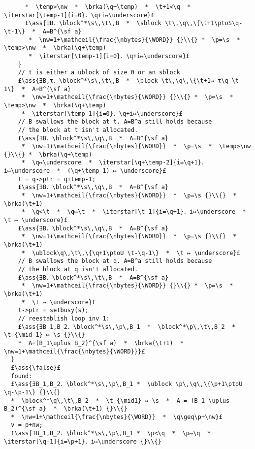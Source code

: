 \documentclass[12pt,a4paper]{article}
\makeatletter
\newcommand{\ml}[2][t]{\mbox{\mdseries\begin{tabular}[#1]{@{}L@{}}#2\end{tabular}}}
\newcommand{\ass}[1]{\ensuremath{{\color{blue}\left\{\ml[c]{#1}\right\}}}}
\newcommand{\iterstar}[2][]{\text{\LARGE $*$}^{#1}_{#2}}
\newcommand{\block}{\mathop{\emph{block}}}
\newcommand{\ublock}{\mathop{\emph{ublock}}}
\newcommand{\sblock}{\mathop{\emph{sblock}}}
\newcommand{\s}{{\tt s}}
\renewcommand{\t}{{\tt t}}
\newcommand{\temp}{{\tt temp}}
\newcommand{\p}{{\tt p}}
\newcommand{\q}{{\tt q}}
\newcommand{\brka}{\mathop{\emph{brka}}}
\newcommand{\nw}{{\tt nw}}
\newcommand{\nbytes}{{\tt nbytes}}
\newcommand{\WORD}{{\tt WORD}}
\newcommand{\mathceil}[1]{\left\lceil#1\right\rceil}
\newcommand{\ptoU}{\mathbin{↦_{\sf u}}}
\newcommand{\ptoS}{\mathbin{↦_{\sf s}}}
\makeatother
\begin{document}
\begin{lstlisting}
      *  \temp>\nw  *  \brka(\q+\temp)  *  \t+1<\q  *  \iterstar[\temp-1]{i=0}．\q+i↦\underscore}£
      £\ass{∃B．\block^*\s\,\t\,B  *  \sblock \t\,\q\,\{\t+1\ptoS\q-\t-1\}  *  A=B^{\sf a} 
       *  \nw=1+\mathceil{\frac{\nbytes}{\WORD}} {}\\{} *  \p=\s  *  \temp>\nw  *  \brka(\q+\temp) 
       *  \iterstar[\temp-1]{i=0}．\q+i↦\underscore}£
    }
    // t is either a ublock of size 0 or an sblock
    £\ass{∃B,τ．\block^*\s\,\t\,B  *  \block \t\,\q\,\{\t+1↦_τ\q-\t-1\}  *  A=B^{\sf a} 
     *  \nw=1+\mathceil{\frac{\nbytes}{\WORD}} {}\\{} *  \p=\s  *  \temp>\nw  *  \brka(\q+\temp) 
     *  \iterstar[\temp-1]{i=0}．\q+i↦\underscore}£
    // B swallows the block at t. A=B^a still holds because 
    // the block at t isn't allocated.
    £\ass{∃B．\block^*\s\,\q\,B  *  A=B^{\sf a}
     *  \nw=1+\mathceil{\frac{\nbytes}{\WORD}}  *  \p=\s  *  \temp>\nw {}\\{} *  \brka(\q+\temp) 
     *  \q↦\underscore  *  \iterstar[\q+\temp-2]{i=\q+1}．i↦\underscore  *  (\q+\temp-1) ↦ \underscore}£
    t = q->ptr = q+temp-1;
    £\ass{∃B．\block^*\s\,\q\,B  *  A=B^{\sf a} 
     *  \nw=1+\mathceil{\frac{\nbytes}{\WORD}}  *  \p=\s {}\\{}  *  \brka(\t+1) 
     *  \q<\t  *  \q↦\t  *  \iterstar[\t-1]{i=\q+1}．i↦\underscore  *  \t ↦ \underscore}£
    £\ass{∃B．\block^*\s\,\q\,B  *  A=B^{\sf a} 
     *  \nw=1+\mathceil{\frac{\nbytes}{\WORD}}  *  \p=\s {}\\{}  *  \brka(\t+1) 
     *  \ublock\q\,\t\,\{\q+1\ptoU \t-\q-1\}  *  \t ↦ \underscore}£
    // B swallows the block at q. A=B^a still holds because 
    // the block at q isn't allocated.
    £\ass{∃B．\block^*\s\,\t\,B  *  A=B^{\sf a} 
     *  \nw=1+\mathceil{\frac{\nbytes}{\WORD}} {}\\{} *  \p=\s  *  \brka(\t+1) 
     *  \t ↦ \underscore}£
    t->ptr = setbusy(s);
    // reestablish loop inv 1:
    £\ass{∃B_1,B_2．\block^*\s\,\p\,B_1  *  \block^*\p\,\t\,B_2  *  \t_{\mid 1} ↦ \s {}\\{}
    *  A=(B_1\uplus B_2)^{\sf a}  *  \brka(\t+1)  *  \nw=1+\mathceil{\frac{\nbytes}{\WORD}}}£
  }
  £\ass{\false}£
  found:
  £\ass{∃B_1,B_2．\block^*\s\,\p\,B_1 *  \ublock \p\,\q\,\{\p+1\ptoU \q-\p-1\} {}\\{}
  *  \block^*\q\,\t\,B_2  *  \t_{\mid1} ↦ \s  *  A = (B_1 \uplus B_2)^{\sf a}  *  \brka(\t+1) {}\\{}
  *  \nw=1+\mathceil{\frac{\nbytes}{\WORD}}  *  \q\geq\p+\nw}£ 
  v = p+nw;
  £\ass{∃B_1,B_2．\block^*\s\,\p\,B_1 *  \p<\q  *  \p↦\q  *  \iterstar[\q-1]{i=\p+1}．i↦\underscore {}\\{}

\end{lstlisting}
\end{document}

